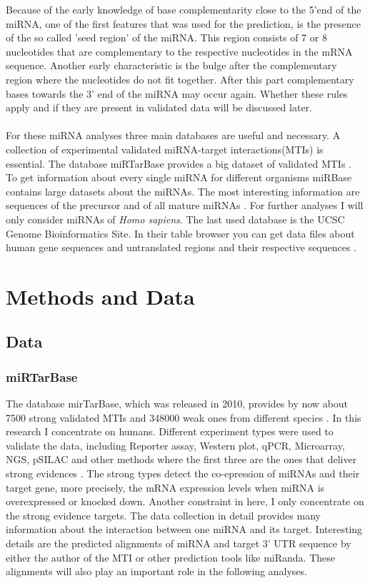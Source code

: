 \documentclass[12pt]{article}
\begin{document}
Because of the early knowledge of base complementarity close to the 5'end of the miRNA, one of the first features that was used for the prediction, is the presence of the so called 'seed region' of the miRNA. This region consists of 7 or 8 nucleotides that are complementary to the respective nucleotides in the mRNA sequence. Another early characteristic is the bulge after the complementary region where the nucleotides do not fit together. After this part complementary bases towards the 3' end of the miRNA may occur again. Whether these rules apply and if they are present in validated data will be discussed later. \\\\
For these miRNA analyses three main databases are useful and necessary. A collection of experimental validated miRNA-target interactions(MTIs) is essential. The database miRTarBase provides a big dataset of validated MTIs \cite{Hsu}. To get information about every single miRNA for different organisms miRBase contains large datasets about the miRNAs. The most interesting information are sequences of the precursor and of all mature miRNAs \cite{mirbase}. For further analyses I will only consider miRNAs of \textit{Homo sapiens}. The last used database is the UCSC Genome Bioinformatics Site. In their table browser you can get data files about human gene sequences and untranslated regions and their respective sequences \cite{ucsc}.
  
\vspace{2cm}


\section{Methods and Data}

 
\subsection{Data} 
\subsubsection{miRTarBase}
The database mirTarBase, which was released in 2010, provides by now about 7500 strong validated MTIs and 348000 weak ones from different species \cite{Chou}. In this research I concentrate on humans. Different experiment types were used to validate the data, including Reporter assay, Western plot, qPCR, Microarray, NGS, pSILAC and other methods where the first three are the ones that deliver strong evidences \cite{Hsu}. The strong types detect the co-epression of miRNAs and their target gene, more precisely, the mRNA expression levels when miRNA is overexpressed or knocked down. Another constraint in here, I only concentrate on the strong evidence targets. The data collection in detail provides many information about the interaction between one miRNA and its target. Interesting details are the predicted alignments of miRNA and target 3' UTR sequence by either the author of the MTI or other prediction tools like miRanda. These alignments will also play an important role in the following analyses. 
\end{document}
